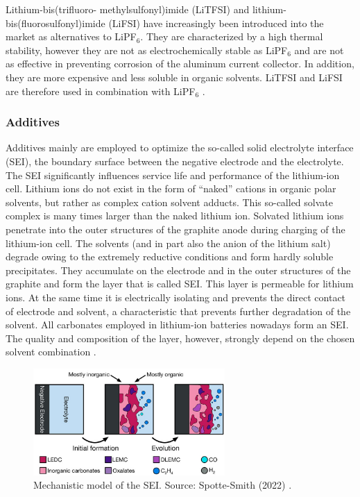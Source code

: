 Lithium-bis(trifluoro- methylsulfonyl)imide (LiTFSI) and lithium-bis(fluorosulfonyl)imide (LiFSI) have increasingly been introduced into the market as alternatives to LiPF$_6$. They are characterized by a high thermal stability, however they are not as electrochemically stable as LiPF$_6$ and are not as effective in preventing corrosion of the aluminum current collector. In addition, they are more expensive and less soluble in organic solvents. LiTFSI and LiFSI are therefore used in combination with LiPF$_6$ \cite{xu2004nonaqueous}.

\subsubsection{Additives}
\label{sec:additives}
Additives mainly are employed to optimize the so-called solid electrolyte interface (SEI), the boundary surface between the negative electrode and the electrolyte. The SEI significantly influences service life and performance of the lithium-ion cell.
Lithium ions do not exist in the form of “naked” cations in organic polar solvents, but rather as complex cation solvent adducts. This so-called solvate complex is many times larger than the naked lithium ion.
Solvated lithium ions penetrate into the outer structures of the graphite anode during charging of the lithium-ion cell. The solvents (and in part also the anion of the lithium salt) degrade owing to the extremely reductive conditions and form hardly soluble precipitates. They accumulate on the electrode and in the outer structures of the graphite and form the layer that is called SEI.
This layer is permeable for lithium ions. At the same time it is electrically isolating and prevents the direct contact of electrode and solvent, a characteristic that prevents further degradation of the solvent. All carbonates employed in lithium-ion batteries nowadays form an SEI. The quality and composition of the layer, however, strongly depend on the chosen solvent combination \cite{korthauer2018lithium}.

\begin{figure}[ht]
    \centering
    \includegraphics[width=0.65\textwidth]{Images/Chapter1/sei.jpeg}
    \caption[Mechanistic model of the SEI]{Mechanistic model of the SEI. Source: Spotte-Smith (2022) \cite{spotte2022toward}.}
    \label{fig:sei}
\end{figure}

